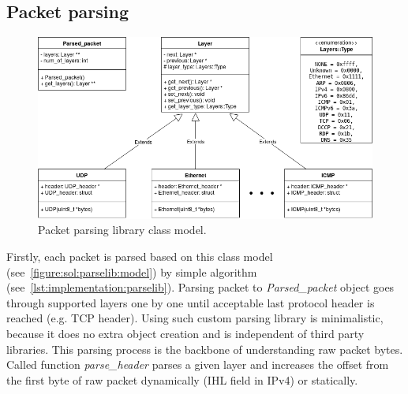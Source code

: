\documentclass[12pt,a4paper,twoside]{book}
\begin{document}
        \subsection{Packet parsing} \label{implementation:sensor:parse}
            \begin{figure}[h]
                \centering
                \includegraphics[scale=0.5]{parsing}
                \caption{Packet parsing library class model.}
                \label{figure:sol:parselib:model}
            \end{figure}
            Firstly, each packet is parsed based on this class model (see~\autoref{figure:sol:parselib:model}) by simple algorithm (see~\autoref{lst:implementation:parselib}). Parsing packet to \emph{Parsed\_packet} object goes through supported layers one by one until acceptable last protocol header is reached (e.g. TCP header). Using such custom parsing library is minimalistic, because it does no extra object creation and is independent of third party libraries. This parsing process is the backbone of understanding raw packet bytes. Called function \emph{parse\_header} parses a given layer and increases the offset from the first byte of raw packet dynamically (IHL field in IPv4) or statically.
            
            
\end{document}
